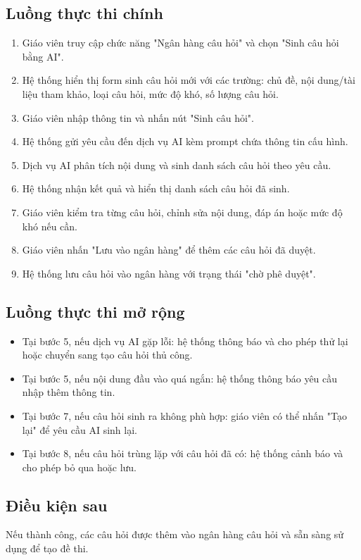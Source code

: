 ﻿\documentclass[../DoAn.tex]{subfiles}
\begin{document}
\subsection{Luồng thực thi chính}
\begin{enumerate}
    \item Giáo viên truy cập chức năng "Ngân hàng câu hỏi" và chọn "Sinh câu hỏi bằng AI".
    \item Hệ thống hiển thị form sinh câu hỏi mới với các trường: chủ đề, nội dung/tài liệu tham khảo, loại câu hỏi, mức độ khó, số lượng câu hỏi.
    \item Giáo viên nhập thông tin và nhấn nút "Sinh câu hỏi".
    \item Hệ thống gửi yêu cầu đến dịch vụ AI kèm prompt chứa thông tin cấu hình.
    \item Dịch vụ AI phân tích nội dung và sinh danh sách câu hỏi theo yêu cầu.
    \item Hệ thống nhận kết quả và hiển thị danh sách câu hỏi đã sinh.
    \item Giáo viên kiểm tra từng câu hỏi, chỉnh sửa nội dung, đáp án hoặc mức độ khó nếu cần.
    \item Giáo viên nhấn "Lưu vào ngân hàng" để thêm các câu hỏi đã duyệt.
    \item Hệ thống lưu câu hỏi vào ngân hàng với trạng thái "chờ phê duyệt".
\end{enumerate}

\subsection{Luồng thực thi mở rộng}
\begin{itemize}
    \item Tại bước 5, nếu dịch vụ AI gặp lỗi: hệ thống thông báo và cho phép thử lại hoặc chuyển sang tạo câu hỏi thủ công.
    \item Tại bước 5, nếu nội dung đầu vào quá ngắn: hệ thống thông báo yêu cầu nhập thêm thông tin.
    \item Tại bước 7, nếu câu hỏi sinh ra không phù hợp: giáo viên có thể nhấn "Tạo lại" để yêu cầu AI sinh lại.
    \item Tại bước 8, nếu câu hỏi trùng lặp với câu hỏi đã có: hệ thống cảnh báo và cho phép bỏ qua hoặc lưu.
\end{itemize}

\subsection{Điều kiện sau}
Nếu thành công, các câu hỏi được thêm vào ngân hàng câu hỏi và sẵn sàng sử dụng để tạo đề thi.
\end{document}
